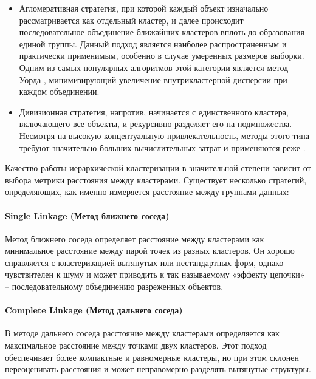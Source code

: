             \begin{itemize}
                \item Агломеративная стратегия, при которой каждый объект изначально рассматривается как отдельный кластер, и далее происходит последовательное объединение ближайших кластеров вплоть до образования единой группы. Данный подход является наиболее распространенным и практически применимым, особенно в случае умеренных размеров выборки. Одним из самых популярных алгоритмов этой категории является метод Уорда \cite{Murtagh2011wardalgo}, минимизирующий увеличение внутрикластерной дисперсии при каждом объединении.
                \item Дивизионная стратегия, напротив, начинается с единственного кластера, включающего все объекты, и рекурсивно разделяет его на подмножества. Несмотря на высокую концептуальную привлекательность, методы этого типа требуют значительно больших вычислительных затрат и применяются реже \cite{Kaufman1990divisive}.
            \end{itemize}

            Качество работы иерархической кластеризации в значительной степени зависит от выбора метрики расстояния между кластерами. Существует несколько стратегий, определяющих, как именно измеряется расстояние между группами данных:

        \paragraph{Single Linkage (Метод ближнего соседа)}
            Метод ближнего соседа \cite{Sibson1973SLINK} определяет расстояние между кластерами как минимальное расстояние между парой точек из разных кластеров. Он хорошо справляется с кластеризацией вытянутых или нестандартных форм, однако чувствителен к шуму и может приводить к так называемому «эффекту цепочки» -- последовательному объединению разреженных объектов.

        \paragraph{Complete Linkage (Метод дальнего соседа)}
            В методе дальнего соседа \cite{Defays1977CLINK} расстояние между кластерами определяется как максимальное расстояние между точками двух кластеров. Этот подход обеспечивает более компактные и равномерные кластеры, но при этом склонен переоценивать расстояния и может неправомерно разделять вытянутые структуры.

